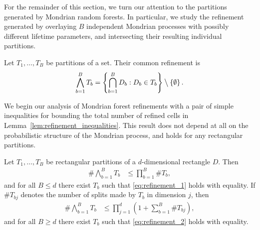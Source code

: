 For the remainder of this section, we turn our attention to the partitions
generated by Mondrian random forests. In particular, we study the refinement
generated by overlaying $B$ independent Mondrian processes with possibly
different lifetime parameters, and intersecting their resulting individual
partitions.

\begin{definition}%
  Let $T_1, \ldots, T_B$ be partitions of a set.
  Their common refinement is
  \begin{align*}
    \bigwedge_{b=1}^B T_b
    = \left\{
      \bigcap_{b=1}^B D_b:
      D_b \in T_b
    \right\}
    \mathbin{\big\backslash}
    \left\{ \emptyset \right\}.
  \end{align*}
\end{definition}

We begin our analysis of Mondrian forest refinements with a pair of simple
inequalities for bounding the total number of refined cells
in Lemma~\ref{lem:refinement_inequalities}. This result does not depend at all
on the probabilistic structure of the Mondrian process, and holds for any
rectangular partitions.

\begin{lemma}
  \label{lem:refinement_inequalities}

  Let $T_1, \ldots, T_B$ be rectangular partitions of a $d$-dimensional
  rectangle $D$. Then
  \begin{align}
    \label{eq:refinement_1}
    \# \bigwedge_{b=1}^B T_b
    &\leq \prod_{b=1}^B \# T_b,
  \end{align}
  and for all $B \leq d$ there exist $T_b$ such that
  \eqref{eq:refinement_1} holds with equality.
  If $\# T_{b j}$ denotes the number of splits
  made by $T_b$ in dimension $j$, then
  \begin{align}
    \label{eq:refinement_2}
    \# \bigwedge_{b=1}^B T_b
    &\leq \prod_{j=1}^d
    \left( 1 + \sum_{b=1}^B \# T_{b j} \right),
  \end{align}
  and for all $B \geq d$ there exist $T_b$ such that
  \eqref{eq:refinement_2} holds with equality.

\end{lemma}

